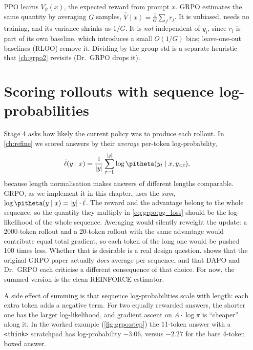 \begin{keyidea}
PPO learns $V_\psi(x)$, the expected reward from prompt $x$. GRPO estimates the same
quantity by averaging $G$ samples, $\hat V(x)=\frac1G\sum_j r_j$. It is unbiased, needs no
training, and its variance shrinks as $1/G$. It is \emph{not} independent of $y_i$, since
$r_i$ is part of its own baseline, which introduces a small $O(1/G)$ bias; leave-one-out
baselines (RLOO) remove it. Dividing by the group std is a separate heuristic that
\cref{ch:grpo2} revisits (Dr.~GRPO drops it).
\end{keyidea}

\section{Scoring rollouts with sequence log-probabilities}\label{sec:grpo:logprobs}

Stage 4 asks how likely the current policy was to produce each rollout. In
\cref{ch:refine} we scored answers by their \emph{average} per-token log-probability,
\begin{equation}
\bar\ell(y\mid x)=\frac1{|y|}\sum_{t=1}^{|y|}\log\pitheta(y_t\mid x,y_{<t}),
\end{equation}
because length normalisation makes answers of different lengths comparable. GRPO, as we
implement it in this chapter, uses the \emph{sum}, $\log\pitheta(y\mid x)=|y|\cdot\bar\ell$.
The reward and the advantage belong to the whole sequence, so the quantity they multiply in
\cref{eq:grpo:pg_loss} should be the log-likelihood of the whole sequence. Averaging would
silently reweight the update: a 2000-token rollout and a 20-token rollout with the same
advantage would contribute equal total gradient, so each token of the long one would be
pushed 100 times less. Whether that is desirable is a real design question.
 shows that the original GRPO paper actually \emph{does} average per sequence,
and that DAPO and Dr.~GRPO each criticise a different consequence of that choice. For now,
the summed version is the clean REINFORCE estimator.

A side effect of summing is that sequence log-probabilities scale with length: each extra
token adds a negative term. For two equally rewarded answers, the shorter one has the
larger log-likelihood, and gradient ascent on $A\cdot\log\pi$ is ``cheaper'' along it. In the
worked example (\cref{fig:grpo:step}) the 11-token answer with a \verb|<think>| scratchpad has
log-probability $-3.06$, versus $-2.27$ for the bare 4-token boxed answer.

